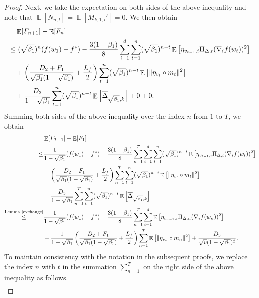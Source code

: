 \documentclass{article} %
\DeclareMathOperator{\Expect}{\mathbb{E}}
\begin{document}
\begin{proof}
Next, we take the expectation on both sides of the above inequality and note that \(\Expect[N_{n,t}] = \Expect[M_{k,1,i}'] = 0\). We then obtain
\begin{align*}
&\Expect[F_{n+1}]-\Expect[F_n]\notag\\ \le&\ (\sqrt{\beta_{1}})^{n}(f(w_1)-f^*)-\frac{3(1-\beta_{1})}{8}\sum_{i=1}^{d}\sum_{t=1}^{n}(\sqrt{\beta_{1}})^{n-t}\Expect\left[\eta_{v_{t-1},i}\Pi_{\Delta,t}(\nabla_{i}f(w_{t}))^{2}\right]\notag\\&+\left(\frac{D_{2}+F_1}{\sqrt{\beta_{1}}(1-\sqrt{\beta_{1}})}+\frac{L_{f}}{2}\right)\sum_{t=1}^{n}(\sqrt{\beta_{1}})^{n-t}\Expect\left[\|\eta_{v_{t}}\circ m_{t}\|^{2}\right]\notag\\&+\frac{D_{3}}{1-\sqrt{\beta_{1}}}\sum_{t=1}^{n}(\sqrt{\beta_{1}})^{n-t}\Expect\left[\overline{\Delta}_{\sqrt{\beta_{1}},k}\right]+0+0.  
\end{align*}
Summing both sides of the above inequality over the index \(n\) from \(1\) to \(T\), we obtain
\begin{align*}
&\Expect[F_{T+1}]-\Expect[F_1]\notag\\\le & \frac{1}{1-\sqrt{\beta_{1}}}(f(w_1)-f^*)-\frac{3(1-\beta_{1})}{8}\sum_{n=1}^{T}\sum_{i=1}^{d}\sum_{t=1}^{n}(\sqrt{\beta_{1}})^{n-t}\Expect\left[\eta_{v_{t-1},i}\Pi_{\Delta,t}(\nabla_{i}f(w_{t}))^{2}\right]\notag\\&+\left(\frac{D_{2}+F_1}{\sqrt{\beta_{1}}(1-\sqrt{\beta_{1}})}+\frac{L_{f}}{2}\right)\sum_{n=1}^{T}\sum_{t=1}^{n}(\sqrt{\beta_{1}})^{n-t}\Expect\left[\|\eta_{v_{t}}\circ m_{t}\|^{2}\right]\notag\\&+\frac{D_{3}}{1-\sqrt{\beta_{1}}}\sum_{n=1}^{T}\sum_{t=1}^{n}(\sqrt{\beta_{1}})^{n-t}\Expect\left[\overline{\Delta}_{\sqrt{\beta_{1}},k}\right]\notag\\\notag\mathop{\le}^{\text{Lemma \ref{exchange}}}&\frac{1}{1-\sqrt{\beta_{1}}}(f(w_1)-f^*)-\frac{3(1-\beta_{1})}{8}\sum_{n=1}^{T}\sum_{i=1}^{d}\Expect\left[\eta_{v_{n-1},i}\Pi_{\Delta,n}(\nabla_{i}f(w_{n}))^{2}\right]\notag\\&+\frac{1}{1-\sqrt{\beta_{1}}}\left(\frac{D_{2}+F_1}{\sqrt{\beta_{1}}(1-\sqrt{\beta_{1}})}+\frac{L_{f}}{2}\right)\sum_{n=1}^{T}\Expect\left[\|\eta_{v_{n}}\circ m_{n}\|^{2}\right]+\frac{D_3}{\sqrt{v}(1-\sqrt{\beta_{1}})^{2}}.  
\end{align*}
To maintain consistency with the notation in the subsequent proofs, we replace the index \(n\) with \(t\) in the summation $\sum_{n=1}^{T}$ on the right side of the above inequality as follows.
\begin{align}\label{adam_w_2}

\end{align}
\end{proof}
\end{document}
